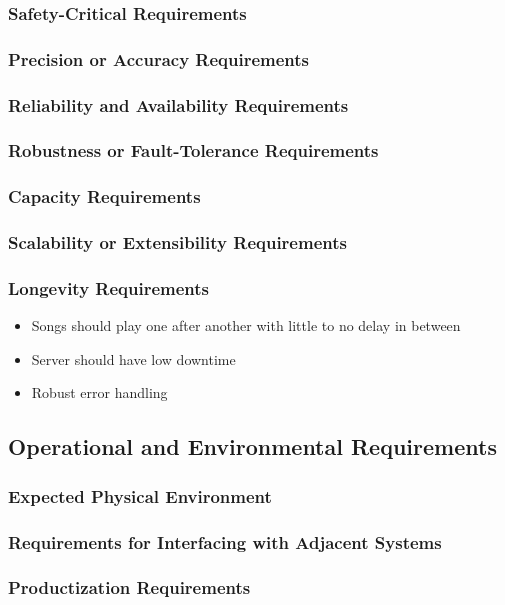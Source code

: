 \documentclass[12pt, titlepage]{article}
\begin{document}
\subsubsection{Safety-Critical Requirements}
\subsubsection{Precision or Accuracy Requirements}
\subsubsection{Reliability and Availability Requirements}
\subsubsection{Robustness or Fault-Tolerance Requirements}
\subsubsection{Capacity Requirements}
\subsubsection{Scalability or Extensibility Requirements}
\subsubsection{Longevity Requirements}
\begin{itemize}
\item Songs should play one after another with little to no delay in between
\item Server should have low downtime
\item Robust error handling
\end{itemize}

\subsection{Operational and Environmental Requirements}
\subsubsection{Expected Physical Environment}
\subsubsection{Requirements for Interfacing with Adjacent Systems}
\subsubsection{Productization Requirements}
\end{document}
